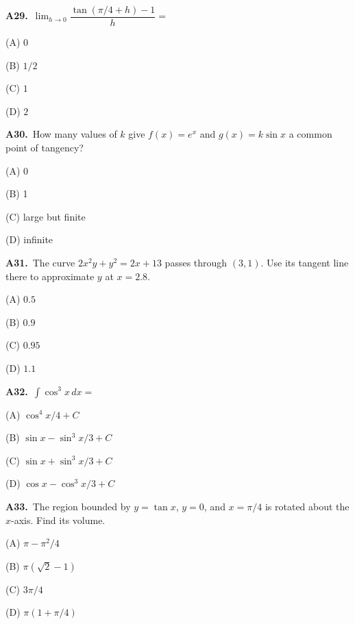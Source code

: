 \documentclass[11pt]{article}
\begin{document}
\bigskip\noindent\textbf{A29.}\ $\lim_{h\to0}\dfrac{\tan(\pi/4+h)-1}{h}=$
\begin{list}{}{\setlength{\leftmargin}{3em}\setlength{\labelwidth}{2.5em}\setlength{\itemsep}{0pt}\setlength{\topsep}{2pt}}
\item[(A)] $0$
\item[(B)] $1/2$
\item[(C)] $1$
\item[(D)] $2$
\end{list}

\bigskip\noindent\textbf{A30.}\ How many values of $k$ give $f(x)=e^x$ and $g(x)=k\sin x$ a common point of tangency?
\begin{list}{}{\setlength{\leftmargin}{3em}\setlength{\labelwidth}{2.5em}\setlength{\itemsep}{0pt}\setlength{\topsep}{2pt}}
\item[(A)] 0
\item[(B)] 1
\item[(C)] large but finite
\item[(D)] infinite
\end{list}

\bigskip\noindent\textbf{A31.}\ The curve $2x^2y+y^2=2x+13$ passes through $(3,1)$. Use its tangent line there to approximate $y$ at $x=2.8$.
\begin{list}{}{\setlength{\leftmargin}{3em}\setlength{\labelwidth}{2.5em}\setlength{\itemsep}{0pt}\setlength{\topsep}{2pt}}
\item[(A)] $0.5$
\item[(B)] $0.9$
\item[(C)] $0.95$
\item[(D)] $1.1$
\end{list}

\bigskip\noindent\textbf{A32.}\ $\int\cos^3x\,dx=$
\begin{list}{}{\setlength{\leftmargin}{3em}\setlength{\labelwidth}{2.5em}\setlength{\itemsep}{0pt}\setlength{\topsep}{2pt}}
\item[(A)] $\cos^4x/4+C$
\item[(B)] $\sin x-\sin^3x/3+C$
\item[(C)] $\sin x+\sin^3x/3+C$
\item[(D)] $\cos x-\cos^3x/3+C$
\end{list}

\bigskip\noindent\textbf{A33.}\ The region bounded by $y=\tan x$, $y=0$, and $x=\pi/4$ is rotated about the $x$-axis. Find its volume.
\begin{list}{}{\setlength{\leftmargin}{3em}\setlength{\labelwidth}{2.5em}\setlength{\itemsep}{0pt}\setlength{\topsep}{2pt}}
\item[(A)] $\pi-\pi^2/4$
\item[(B)] $\pi(\sqrt2-1)$
\item[(C)] $3\pi/4$
\item[(D)] $\pi(1+\pi/4)$
\end{list}
\end{document}

